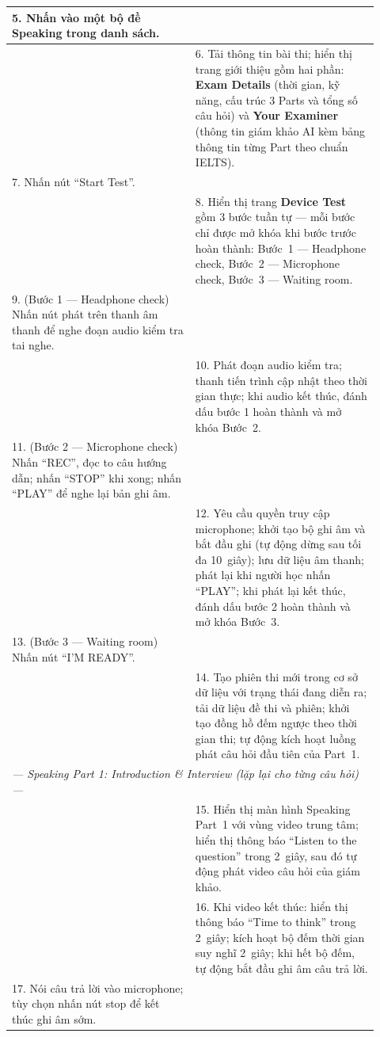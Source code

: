 \begin{longtable}{|p{0.46\linewidth}|p{0.46\linewidth}|}
    5. Nhấn vào một bộ đề Speaking trong danh sách. & \\ \hline
    & 6. Tải thông tin bài thi; hiển thị trang giới thiệu gồm hai phần: \textbf{Exam Details} (thời gian, kỹ năng, cấu trúc 3 Parts và tổng số câu hỏi) và \textbf{Your Examiner} (thông tin giám khảo AI kèm bảng thông tin từng Part theo chuẩn IELTS). \\ \hline
    7. Nhấn nút ``Start Test''. & \\ \hline
    & 8. Hiển thị trang \textbf{Device Test} gồm 3 bước tuần tự --- mỗi bước chỉ được mở khóa khi bước trước hoàn thành: Bước~1 --- Headphone check, Bước~2 --- Microphone check, Bước~3 --- Waiting room. \\ \hline
    9. (Bước 1 --- Headphone check) Nhấn nút phát trên thanh âm thanh để nghe đoạn audio kiểm tra tai nghe. & \\ \hline
    & 10. Phát đoạn audio kiểm tra; thanh tiến trình cập nhật theo thời gian thực; khi audio kết thúc, đánh dấu bước 1 hoàn thành và mở khóa Bước~2. \\ \hline
    11. (Bước 2 --- Microphone check) Nhấn ``REC'', đọc to câu hướng dẫn; nhấn ``STOP'' khi xong; nhấn ``PLAY'' để nghe lại bản ghi âm. & \\ \hline
    & 12. Yêu cầu quyền truy cập microphone; khởi tạo bộ ghi âm và bắt đầu ghi (tự động dừng sau tối đa 10~giây); lưu dữ liệu âm thanh; phát lại khi người học nhấn ``PLAY''; khi phát lại kết thúc, đánh dấu bước 2 hoàn thành và mở khóa Bước~3. \\ \hline
    13. (Bước 3 --- Waiting room) Nhấn nút ``I'M READY''. & \\ \hline
    & 14. Tạo phiên thi mới trong cơ sở dữ liệu với trạng thái đang diễn ra; tải dữ liệu đề thi và phiên; khởi tạo đồng hồ đếm ngược theo thời gian thi; tự động kích hoạt luồng phát câu hỏi đầu tiên của Part~1. \\ \hline
    \multicolumn{2}{|l|}{\textit{--- Speaking Part 1: Introduction \& Interview (lặp lại cho từng câu hỏi) ---}} \\ \hline
    & 15. Hiển thị màn hình Speaking Part~1 với vùng video trung tâm; hiển thị thông báo ``Listen to the question'' trong 2~giây, sau đó tự động phát video câu hỏi của giám khảo. \\ \hline
    & 16. Khi video kết thúc: hiển thị thông báo ``Time to think'' trong 2~giây; kích hoạt bộ đếm thời gian suy nghĩ 2~giây; khi hết bộ đếm, tự động bắt đầu ghi âm câu trả lời. \\ \hline
    17. Nói câu trả lời vào microphone; tùy chọn nhấn nút stop để kết thúc ghi âm sớm. & \\ \hline

\end{longtable}
